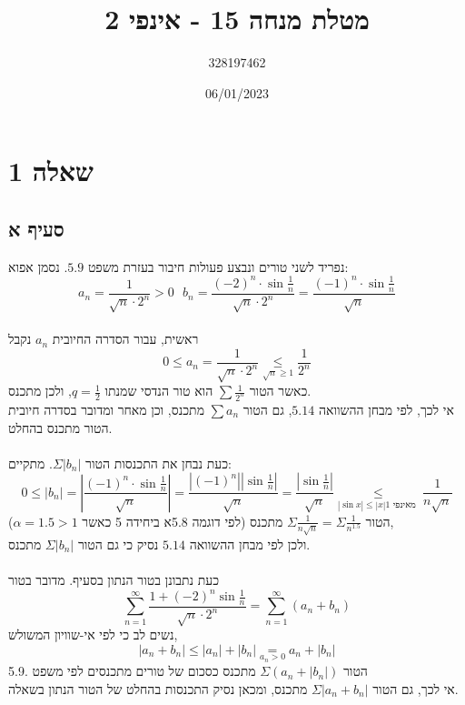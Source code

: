 \documentclass{article}
\title{מטלת מנחה 15 - אינפי 2}
\author{328197462}
\date{06/01/2023}
\newcommand\underrel[2]{\mathrel{\mathop{#2}\limits_{#1}}}
\begin{document}
\long{}
\maketitle

\section*{שאלה 1}

\subsection*{סעיף א}

נפריד לשני טורים ונבצע פעולות חיבור בעזרת משפט $5.9$. נסמן אפוא:
\[
    a_n = \frac{1}{\sqrt{n}\cdot 2^n}>0 \ \ \
    b_n = \frac{(-2)^n\cdot \sin \frac{1}{n}}{\sqrt{n}\cdot 2^n}
    = \frac{(-1)^n \cdot \sin \frac{1}{n}}{\sqrt{n}}
\]
\\
ראשית, עבור הסדרה החיובית $a_n$ נקבל
\[
    0\leq a_n = \frac{1}{\sqrt{n}\cdot 2^n} \underrel{\sqrt{n}\geq 1}{\leq} \frac{1}{2^n}
\]
כאשר הטור $\sum \frac{1}{2^n}$ הוא טור הנדסי שמנתו $q=\frac{1}{2}$, ולכן מתכנס. \\
אי לכך, לפי מבחן ההשוואה $5.14$, גם הטור $\sum a_n$ מתכנס, וכן מאחר ומדובר בסדרה חיובית הטור מתכנס בהחלט.
\\\\
כעת נבחן את התכנסות הטור $\Sigma|b_n|$. מתקיים:
\[
    0\leq|b_n|=\left|\frac{(-1)^n \cdot \sin \frac{1}{n}}{\sqrt{n}}\right| =
    \frac{|(-1)^n| |\sin \frac{1}{n}|}{\sqrt{n}}=
    \frac{|\sin \frac{1}{n}|}{\sqrt{n}} \underrel{|\sin x|\leq |x| \text{מאינפי 1 }}{\leq}
    \frac{1}{n\sqrt{n}}
\]
הטור $\Sigma \frac{1}{n\sqrt{n}}=\Sigma \frac{1}{n^{1.5}}$
מתכנס (לפי דוגמה 5.8א ביחידה 5 כאשר $\alpha=1.5>1$), \\
ולכן לפי מבחן ההשוואה $5.14$ נסיק כי גם הטור $\Sigma |b_n|$ מתכנס.
\\\\
כעת נתבונן בטור הנתון בסעיף. מדובר בטור
\[
    \sum_{n=1}^\infty \frac{1+(-2)^n\sin\frac{1}{n}}{\sqrt{n}\cdot 2^n}=
    \sum_{n=1}^\infty (a_n+b_n)
\]
נשים לב כי לפי אי-שוויון המשולש,
\[
    |a_n+b_n|\leq |a_n|+|b_n| \underrel{a_n>0}{=} a_n + |b_n|
\]
הטור $\Sigma(a_n +|b_n|)$ מתכנס כסכום של טורים מתכנסים לפי משפט .5.9 \\
אי לכך, גם הטור $\Sigma|a_n+b_n|$ מתכנס, ומכאן נסיק התכנסות בהחלט של הטור הנתון בשאלה.
\end{document}
